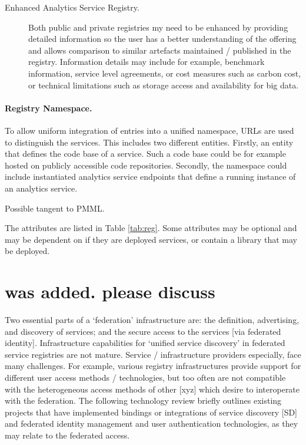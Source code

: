\documentclass[12pt]{article}
\begin{document}
\begin{description}
\item[Enhanced Analytics Service Registry.] Both public and private registries my need to be enhanced by providing detailed information so the user has a better understanding of the offering and allows comparison to similar artefacts maintained / published in the registry. Information details may include for example, benchmark information, service level agreements, or cost measures such as carbon cost, or technical limitations such as storage access and availability for big data.
\end{description}

\paragraph{Registry Namespace.} To allow uniform integration of entries into a unified namespace, URLs are used to distinguish the services. This includes two different entities. Firstly, an entity that defines the code base of a service. Such a code base could be for example hosted on publicly accessible code repositories. Secondly, the namespace could include instantiated analytics service endpoints that define a running instance of an analytics service.        

Possible tangent to PMML. 

The attributes are listed in Table \ref{tab:reg}. Some attributes may be optional and may be dependent on if they are deployed services, or contain a library that may be deployed.

\section{was added. please discuss}



Two essential parts of a ‘federation’ infrastructure are: the definition, advertising, and discovery of services; and the secure access to the services [via federated identity]. 
Infrastructure capabilities for ‘unified service discovery’ in federated service registries are not mature. Service / infrastructure providers especially, face many challenges. For example, various registry infrastructures provide support for different user access methods / technologies, but too often are not compatible with the heterogeneous access methods of other [xyz] which desire to interoperate with the federation. 
The following technology review briefly outlines existing projects that have implemented bindings or integrations of service discovery [SD] and federated identity management and user authentication technologies, as they may relate to the federated access.
\end{document}
